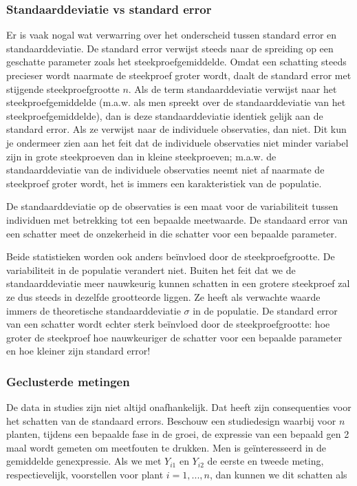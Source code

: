 \documentclass[12pt,dutch,coursenotes]{book}
\theoremstyle{definition}
\theoremstyle{definition}
\theoremstyle{definition}
\theoremstyle{remark}
\begin{document}
\subsubsection{Standaarddeviatie vs standard
error}\label{standaarddeviatie-vs-standard-error}

Er is vaak nogal wat verwarring over het onderscheid tussen standard
error en standaarddeviatie. De standard error verwijst steeds naar de
spreiding op een geschatte parameter zoals het steekproefgemiddelde.
Omdat een schatting steeds precieser wordt naarmate de steekproef groter
wordt, daalt de standard error met stijgende steekproefgrootte \(n\).
Als de term standaarddeviatie verwijst naar het steekproefgemiddelde
(m.a.w. als men spreekt over de standaarddeviatie van het
steekproefgemiddelde), dan is deze standaarddeviatie identiek gelijk aan
de standard error. Als ze verwijst naar de individuele observaties, dan
niet. Dit kun je ondermeer zien aan het feit dat de individuele
observaties niet minder variabel zijn in grote steekproeven dan in
kleine steekproeven; m.a.w. de standaarddeviatie van de individuele
observaties neemt niet af naarmate de steekproef groter wordt, het is
immers een karakteristiek van de populatie.

De standaarddeviatie op de observaties is een maat voor de variabiliteit
tussen individuen met betrekking tot een bepaalde meetwaarde. De
standaard error van een schatter meet de onzekerheid in die schatter
voor een bepaalde parameter.

Beide statistieken worden ook anders beïnvloed door de
steekproefgrootte. De variabiliteit in de populatie verandert niet.
Buiten het feit dat we de standaarddeviatie meer nauwkeurig kunnen
schatten in een grotere steekproef zal ze dus steeds in dezelfde
grootteorde liggen. Ze heeft als verwachte waarde immers de theoretische
standaarddeviatie \(\sigma\) in de populatie. De standard error van een
schatter wordt echter sterk beïnvloed door de steekproefgrootte: hoe
groter de steekproef hoe nauwkeuriger de schatter voor een bepaalde
parameter en hoe kleiner zijn standard error!

\subsubsection{Geclusterde metingen}\label{geclusterde-metingen}

De data in studies zijn niet altijd onafhankelijk. Dat heeft zijn
consequenties voor het schatten van de standaard errors. Beschouw een
studiedesign waarbij voor \(n\) planten, tijdens een bepaalde fase in de
groei, de expressie van een bepaald gen 2 maal wordt gemeten om
meetfouten te drukken. Men is geïnteresseerd in de gemiddelde
genexpressie. Als we met \(Y_{i1}\) en \(Y_{i2}\) de eerste en tweede
meting, respectievelijk, voorstellen voor plant \(i=1,...,n\), dan
kunnen we dit schatten als
\end{document}
